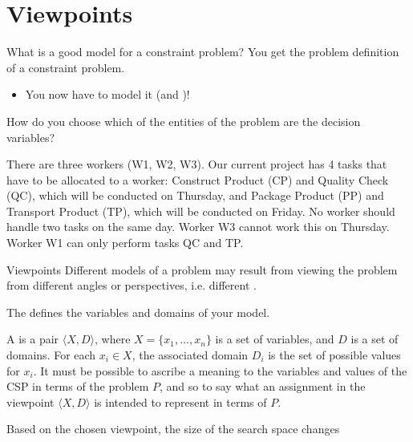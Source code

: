 \documentclass{cons-beamer}
\begin{document}
\section{Viewpoints}

\begin{frame}{What is a good model for a constraint problem?}
  You get the problem definition of a constraint problem. \vfill 
  \begin{itemize}
    \item You now have to model it  (and )!
  \end{itemize}
  \vfill 

  How do you choose which of the entities of the problem are the decision variables?
  \vfill 

  \begin{example}
    There are three workers (W1, W2, W3). Our current project has 4 tasks that have to be allocated to a worker: Construct Product (CP) and Quality Check (QC), which will be conducted on Thursday, and Package Product (PP) and Transport Product (TP), which will be conducted on Friday. No worker should handle two tasks on the same day.  Worker W3 cannot work this on Thursday. Worker W1 can only perform tasks QC and TP.
  \end{example}
\end{frame}

\begin{frame}{Viewpoints}
  Different models of a problem may result from viewing the problem from different angles or perspectives, i.e. different .
  \vfill

  The  defines the variables and domains of your model.
  \vfill

  \begin{definition}
    A  is a pair \(\langle X, D \rangle\), where \(X = \{x_1, \ldots, x_n\}\) is a set of variables, and \(D\) is a set of domains. For each \(x_i \in X\), the associated domain \(D_i\) is the set of possible values for \(x_i\). It must be possible to ascribe a meaning to the variables and values of the CSP in terms of the problem \(P\), and so to say what an assignment in the viewpoint \(\langle X, D \rangle\) is intended to represent in terms of \(P\).
  \end{definition}
  \vfill

  \alert{Based on the chosen viewpoint, the size of the search space changes}
\end{frame}
\end{document}
